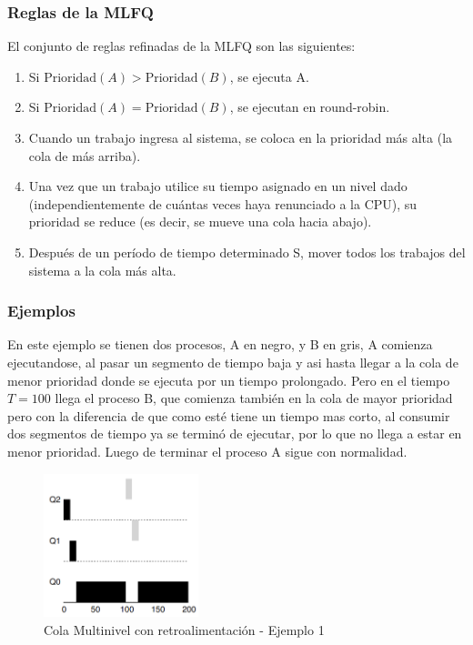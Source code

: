 \documentclass{article}
\begin{document}
\subsubsection{Reglas de la MLFQ}
El conjunto de reglas refinadas de la MLFQ son las siguientes:
\begin{enumerate}
    \item Si $\text{Prioridad}(A)>\text{Prioridad}(B)$, se ejecuta A.
    \item Si $\text{Prioridad}(A)=\text{Prioridad}(B)$, se ejecutan en round-robin.
    \item Cuando un trabajo ingresa al sistema,  se coloca en la prioridad más alta (la cola de más arriba).
    \item Una vez que un trabajo utilice su tiempo asignado en un nivel dado (independientemente de cuántas veces haya renunciado a la CPU), su prioridad se reduce (es decir, se mueve una cola hacia abajo).
    \item Después de un período de tiempo determinado S, mover todos los trabajos del sistema a la cola más alta.
\end{enumerate}

\subsubsection{Ejemplos}

En este ejemplo se tienen dos procesos, A en negro, y B en gris, A comienza ejecutandose, al pasar un segmento de tiempo baja y asi hasta llegar a la cola de menor prioridad donde se ejecuta por un tiempo prolongado. Pero en el tiempo $T=100$ llega el proceso B, que comienza también en la cola de mayor prioridad pero con la diferencia de que como esté tiene un tiempo mas corto, al consumir dos segmentos de tiempo ya se terminó de ejecutar, por lo que no llega a estar en menor prioridad. Luego de terminar el proceso A sigue con normalidad.
\begin{figure}[h]
    \centering
    \includegraphics[width=0.4\textwidth]{src/mlfq.png}
    \caption{Cola Multinivel con retroalimentación - Ejemplo 1}
\end{figure}
\end{document}
